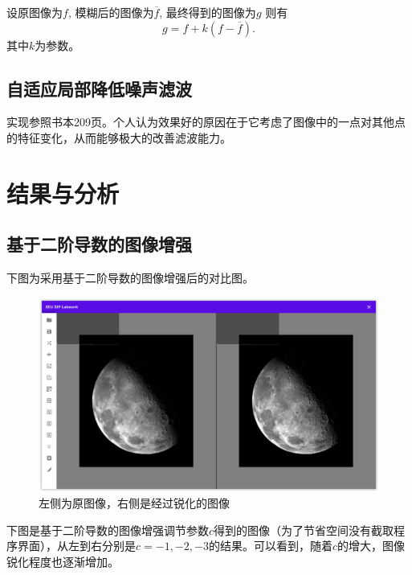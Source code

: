 \documentclass{article}
\begin{document}
设原图像为$f$, 模糊后的图像为$\overline{f}$, 最终得到的图像为$g$ 则有$$g=f+k(f-\overline{f}).$$ 其中$k$为参数。

\subsection{自适应局部降低噪声滤波}

实现参照书本209页。个人认为效果好的原因在于它考虑了图像中的一点对其他点的特征变化，从而能够极大的改善滤波能力。

\section{结果与分析}

\subsection{基于二阶导数的图像增强}

下图为采用基于二阶导数的图像增强后的对比图。

\begin{figure}[H]
    \includegraphics[width=\textwidth]{img/laplace-sharpening.png}
    \caption{左侧为原图像，右侧是经过锐化的图像}
\end{figure}

下图是基于二阶导数的图像增强调节参数$c$得到的图像（为了节省空间没有截取程序界面），从左到右分别是$c=-1, -2, -3$的结果。可以看到，随着$c$的增大，图像锐化程度也逐渐增加。
\end{document}

